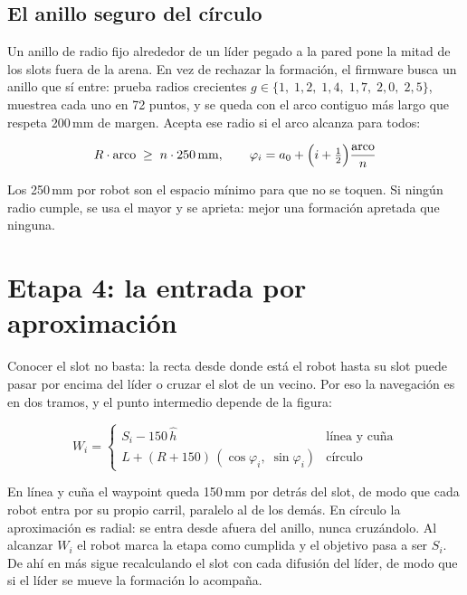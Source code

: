 \documentclass[11pt,a4paper]{article}
\theoremstyle{plain}
\newcommand{\hh}{\hat{h}}
\begin{document}
\subsection{El anillo seguro del círculo}
\label{sec:anillo}

Un anillo de radio fijo alrededor de un líder pegado a la pared pone la mitad
de los slots fuera de la arena. En vez de rechazar la formación, el firmware
busca un anillo que sí entre: prueba radios crecientes
$g \in \{1,\; 1{,}2,\; 1{,}4,\; 1{,}7,\; 2{,}0,\; 2{,}5\}$, muestrea cada uno
en 72 puntos, y se queda con el arco contiguo más largo que respeta 200\,mm de
margen. Acepta ese radio si el arco alcanza para todos:

\begin{equation}
  R \cdot \text{arco} \;\ge\; n \cdot 250\,\text{mm},
  \qquad
  \varphi_i = a_0 + \Bigl(i + \tfrac{1}{2}\Bigr)\frac{\text{arco}}{n}
  \label{eq:anillo-seguro}
\end{equation}

Los 250\,mm por robot son el espacio mínimo para que no se toquen. Si ningún
radio cumple, se usa el mayor y se aprieta: mejor una formación apretada que
ninguna.

\section{Etapa 4: la entrada por aproximación}

Conocer el slot no basta: la recta desde donde está el robot hasta su slot
puede pasar por encima del líder o cruzar el slot de un vecino. Por eso la
navegación es en dos tramos, y el punto intermedio depende de la figura:

\begin{equation}
  W_i = \begin{cases}
    S_i - 150\,\hh
      & \text{línea y cuña}\\[4pt]
    L + (R + 150)\,(\cos\varphi_i,\; \sin\varphi_i)
      & \text{círculo}
  \end{cases}
  \label{eq:staging}
\end{equation}

En línea y cuña el waypoint queda 150\,mm por detrás del slot, de modo que cada
robot entra por su propio carril, paralelo al de los demás. En círculo la
aproximación es radial: se entra desde afuera del anillo, nunca cruzándolo. Al
alcanzar $W_i$ el robot marca la etapa como cumplida y el objetivo pasa a ser
$S_i$. De ahí en más sigue recalculando el slot con cada difusión del líder, de
modo que si el líder se mueve la formación lo acompaña.
\end{document}
